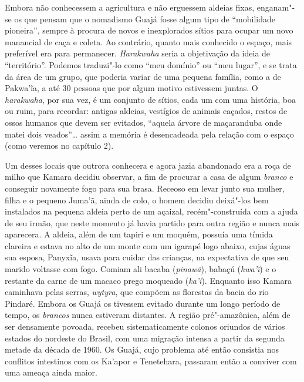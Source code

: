 Embora não conhecessem a agricultura e não erguessem aldeias fixas,
enganam"-se os que pensam que o nomadismo Guajá fosse algum tipo de
``mobilidade pioneira'', sempre à procura de novos e inexplorados sítios
para ocupar um novo manancial de caça e coleta. Ao contrário, quanto
mais conhecido o espaço, mais preferível era para permanecer.
\emph{Harakwaha} seria a objetivação da ideia de ``território''. Podemos
traduzi"-lo como ``meu domínio'' ou ``meu lugar'', e se trata da área de
um grupo, que poderia variar de uma pequena família, como a de Pakwa'ĩa,
a até 30 pessoas que por algum motivo estivessem juntas. O
\emph{harakwaha}, por sua vez, é um conjunto de sítios, cada um com uma
história, boa ou ruim, para recordar: antigas aldeias, vestígios de
animais caçados, restos de ossos humanos que devem ser evitados,
``aquela árvore de maçaranduba onde matei dois veados''\ldots{} assim a
memória é desencadeada pela relação com o espaço (como veremos no
capítulo 2).

Um desses locais que outrora conhecera e agora jazia abandonado era a roça
de milho que Kamara decidiu observar, a fim de procurar a casa de algum
\emph{branco} e conseguir novamente fogo para sua brasa. Receoso em
levar junto sua mulher, filha e o pequeno Juma'ã, ainda de colo, o homem
decidiu deixá"-los bem instalados na pequena aldeia perto de um açaizal,
recém"-construída com a ajuda de seu irmão, que neste momento já havia
partido para outra região e nunca mais aparecera. A aldeia, além de um
tapiri e um moquém, possuía uma tímida clareira e estava no alto de um
monte com um igarapé logo abaixo, cujas águas sua esposa, Panyxĩa, usava
para cuidar das crianças, na expectativa de que seu marido voltasse com
fogo. Comiam ali bacaba (\emph{pinawã}), babaçú (\emph{hwa'ĩ}) e o
restante da carne de um macaco prego moqueado (\emph{ka'i}). Enquanto
isso Kamara caminhava pelas serras, \emph{wytyra}, que compõem as
florestas da bacia do rio Pindaré. Embora os Guajá os tivessem evitado
durante um longo período de tempo, os \emph{brancos} nunca estiveram
distantes. A região pré"-amazônica, além de ser densamente povoada,
recebeu sistematicamente colonos oriundos de vários estados do nordeste
do Brasil, com uma migração intensa a partir da segunda metade da década
de 1960. Os Guajá, cujo problema até então consistia nos conflitos
intestinos com os Ka'apor e Tenetehara, passaram então a conviver com
uma ameaça ainda maior.

